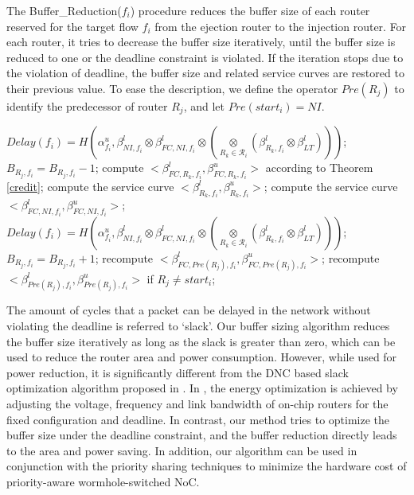 \documentclass[preprint]{elsarticle}
\begin{document}
The Buffer\_Reduction($f_i$) procedure reduces the buffer size of each router reserved for the target flow $f_i$ from the ejection router to the injection router. For each router, it tries to decrease the buffer size iteratively, until the buffer size is reduced to one or the deadline constraint is violated. If the iteration stops due to the violation of deadline, the buffer size and related service curves are restored to their previous value. To ease the description, we define the operator $Pre(R_j)$ to identify the predecessor of router $R_j$, and let $Pre(start_i)=NI$.
\begin{algorithm}
\begin{algorithmic}[1]
            \State $Delay(f_i)=H(\alpha_{f_i}^u,\beta_{NI,f_i}^l\otimes\beta^l_{FC,NI,f_i}\otimes (\underset{R_k\in\mathcal{R}_{i}}{\otimes}(\beta^l_{R_k,f_i}\otimes\beta^l_{LT})))$;
                \State $B_{R_j,f_i}=B_{R_j,f_i}-1$;
                    \State compute $<\beta_{FC,R_k,f_i}^l,\beta_{FC,R_k,f_i}^u>$ according to Theorem \ref{credit};
                    \State compute the service curve $<\beta_{R_k,f_i}^l,\beta_{R_k,f_i}^u>$;
                \EndFor
                \State compute the service curve $<\beta_{FC,NI,f_i}^l,\beta_{FC,NI,f_i}^u>$;
                \State $Delay(f_i)=H(\alpha_{f_i}^u,\beta_{NI,f_i}^l\otimes\beta^l_{FC,NI,f_i}\otimes (\underset{R_k\in\mathcal{R}_{i}}{\otimes}(\beta^l_{R_k,f_i}\otimes\beta^l_{LT})))$;
            \EndWhile
                \State $B_{R_j,f_i}=B_{R_j,f_i}+1$;
                \State recompute $<\beta_{FC,Pre(R_j),f_i}^l,\beta_{FC,Pre(R_j),f_i}^u>$;
                \State recompute $<\beta_{Pre(R_j),f_i}^l,\beta_{Pre(R_j),f_i}^u>$ if $R_j\neq start_i$;
            \EndIf
        \EndFor
\EndProcedure
\end{algorithmic}
\end{algorithm}

The amount of cycles that a packet can be delayed in the network without violating the deadline is referred to `slack'. Our buffer sizing algorithm reduces the buffer size iteratively as long as the slack is greater than zero, which can be used to reduce the router area and power consumption. However, while used for power reduction, it is significantly different from the DNC based slack optimization algorithm proposed in \cite{6560630}. In \cite{6560630}, the energy optimization is achieved by adjusting the voltage, frequency and link bandwidth of on-chip routers for the fixed configuration and deadline. In contrast, our method tries to optimize the buffer size under the deadline constraint, and the buffer reduction directly leads to the area and power saving. In addition, our algorithm can be used in conjunction with the priority sharing techniques \cite{5161497} to minimize the hardware cost of priority-aware wormhole-switched NoC.
\end{document}
